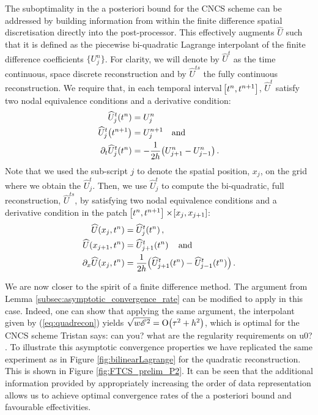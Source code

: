 \documentclass[final]{amsart}
\newcommand{\tristan}[1]{{\color{purple} Tristan says:  #1 }}
\numberwithin{equation}{section}
\begin{document}
The suboptimality in the a posteriori bound for the CNCS scheme can be
addressed by building information from within the finite difference
spatial discretisation directly into the post-processor.  This
effectively augments $\widehat U$ such that it is defined as the
piecewise bi-quadratic Lagrange interpolant of the finite difference
coefficients $\{U^n_j\}$.  For clarity, we will denote by $\widehat{
  U}^t$ as the time continuous, space discrete reconstruction and by
$\widehat{ U}^{ts}$ the fully continuous reconstruction.  We require
that, in each temporal interval $\!\left[{t^n, t^{n+1}}\right]$, $\widehat{ U}^t$
satisfy two nodal equivalence conditions and a derivative condition:
\begin{equation}
  \label{eq:quadrecon}
\begin{split}
\widehat{U}_j^t\!\left({t^n}\right) &= U_j^n
\\
\widehat{U}_j^t\!\left({t^{n+1}}\right) &= U_j^{n+1}\quad \text{and}
\\
\partial_t\widehat{U}_j^t\!\left({t^n}\right) &= -\frac{1}{2h}\!\left({U_{j+1}^{n}-U_{j-1}^{n}}\right).
\end{split}
\end{equation}
Note that we used the sub-script $j$ to denote the spatial position, $x_j$, on the grid where we obtain the $\widehat{U}^t_j$.  Then, we use  $\widehat{U}^t_j$ to compute the bi-quadratic, full reconstruction,  $\widehat{ U}^{ts}$, by satisfying two nodal equivalence conditions and a derivative condition  in the patch $\!\left[{t^n,t^{n+1}}\right]\times\!\left[{x_j,x_{j+1}}\right]$:
\begin{equation}
 \begin{split}
\widehat U(x_j,t^n) &= \widehat{U}_j^t\!\left({t^n}\right) ,
\\
\widehat U(x_{j+1},t^n) &= \widehat{U}_{j+1}^t\!\left({t^n}\right) \quad \text{and}
\\
\partial_x \widehat U(x_j, t^n) &= \frac 1 {2h} \!\left({\widehat{U}_{j+1}^t\!\left({t^n}\right) -\widehat{U}_{j-1}^t\!\left({t^n}\right) }\right).
\end{split}
\end{equation}

We are now closer to the spirit of a finite difference method. The
argument from Lemma \ref{subsec:asymptotic_convergence_rate} can be
modified to apply in this case. Indeed, one can show that applying the
same argument, the interpolant given by (\ref{eq:quadrecon}) yields
$\sqrt{w\mathscr E^2} = \operatorname{O}\!\left({\tau^2+h^2}\right)$, which is optimal for the CNCS
scheme \tristan{can you? what are the regularity requirements on
  u0?}. To illustrate this asymptotic convergence properties we have
replicated the same experiment as in Figure \ref{fig:bilinearLagrange}
for the quadratic reconstruction. This is shown in Figure
\ref{fig:FTCS_prelim_P2}.  It can be seen that the additional
information provided by appropriately increasing the order of data
representation allows us to achieve optimal convergence rates of the a
posteriori bound and favourable effectivities.
\end{document}
